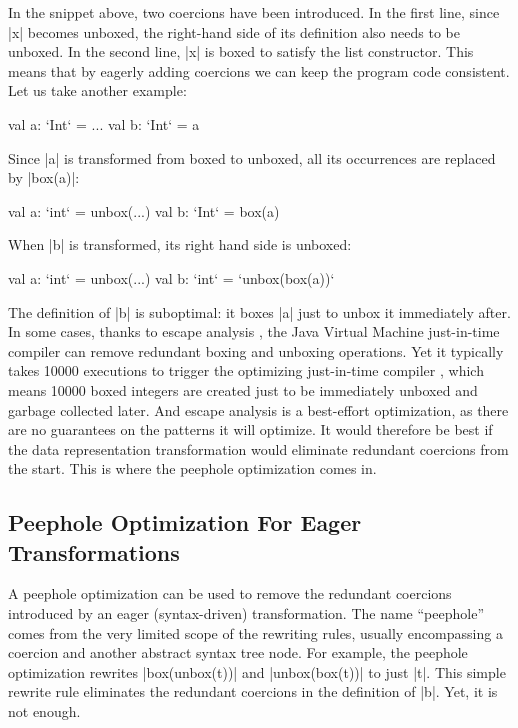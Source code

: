 In the snippet above, two coercions have been introduced. In the first line, since |x| becomes unboxed, the right-hand side of its definition also needs to be unboxed. In the second line, |x| is boxed to satisfy the list constructor. This means that by eagerly adding coercions we can keep the program code consistent. Let us take another example:

\begin{lstlisting-nobreak}
 val a: `Int` = ...
 val b: `Int` = a
\end{lstlisting-nobreak}

Since |a| is transformed from boxed to unboxed, all its occurrences are replaced by |box(a)|:

\begin{lstlisting-nobreak}
 val a: `int` = unbox(...)
 val b: `Int` = box(a)
\end{lstlisting-nobreak}

When |b| is transformed, its right hand side is unboxed:

\begin{lstlisting-nobreak}
 val a: `int` = unbox(...)
 val b: `int` = `unbox(box(a))`
\end{lstlisting-nobreak}

The definition of |b| is suboptimal: it boxes |a| just to unbox it immediately after. In some cases, thanks to escape analysis \cite{stadler-escape-analysis}, the Java Virtual Machine just-in-time compiler \cite{hotspot-c1, hotspot-c2} can remove redundant boxing and unboxing operations. Yet it typically takes 10000 executions to trigger the optimizing just-in-time compiler \cite{hotspot-c2-thresholds}, which means 10000 boxed integers are created just to be immediately unboxed and garbage collected later. And escape analysis is a best-effort optimization, as there are no guarantees on the patterns it will optimize. It would therefore be best if the data representation transformation would eliminate redundant coercions from the start. This is where the peephole optimization comes in.

\subsection{Peephole Optimization For Eager Transformations}
\label{ldl:sec:problem/peephole}

A peephole optimization \cite{spj-unboxed-values, miniboxing} can be used to remove the redundant coercions introduced by an eager (syntax-driven) transformation. The name ``peephole'' comes from the very limited scope of the rewriting rules, usually encompassing a coercion and another abstract syntax tree node. For example, the peephole optimization rewrites |box(unbox(t))| and |unbox(box(t))| to just |t|. This simple rewrite rule eliminates the redundant coercions in the definition of |b|. Yet, it is not enough.

